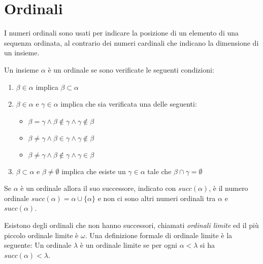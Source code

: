 \section{Ordinali}
I numeri ordinali sono usati per indicare la posizione di un elemento di una sequenza
ordinata, al contrario dei numeri cardinali che indicano la dimensione di un insieme.

Un insieme $\alpha$ è un ordinale se sono verificate le seguenti condizioni:
\begin{enumerate}
    \item $\beta \in \alpha$ implica $\beta \subset \alpha$
    \item $\beta \in \alpha$ e $\gamma \in \alpha$ implica che sia verificata una delle seguenti:
          \begin{itemize}
              \item $\beta = \gamma \land \beta \not \in \gamma \land \gamma \not \in \beta$
              \item $\beta \neq \gamma \land \beta \in \gamma \land \gamma \not \in \beta$
              \item $\beta \neq \gamma \land \beta \not \in \gamma \land \gamma \in \beta$
          \end{itemize}
    \item $\beta \subset \alpha$ e $\beta \neq \emptyset$ implica che esiste un $\gamma \in \alpha$
          tale che $\beta \cap \gamma = \emptyset$
\end{enumerate}

Se $\alpha$ è un ordinale allora il suo successore, indicato con $succ(\alpha)$,
è il numero ordinale $succ(\alpha) = \alpha \cup \{\alpha\}$ e non ci sono altri
numeri ordinali tra $\alpha$ e $succ(\alpha)$.

Esistono degli ordinali che non hanno successori, chiamati \emph{ordinali limite}
ed il più piccolo ordinale limite è $\omega$.
Una definizione formale di ordinale limite è la seguente:
Un ordinale $\lambda$ è un ordinale limite se per ogni $\alpha < \lambda$ si ha $succ(\alpha) < \lambda$.
